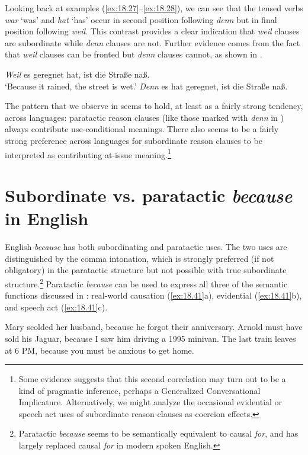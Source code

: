 Looking back at examples (\ref{ex:18.27}--\ref{ex:18.28}), we can see that the tensed verbs \textit{war} ‘was’ and \textit{hat} ‘has’ occur in second position following \textit{denn} but in final position following \textit{weil}. This contrast provides a clear indication that \textit{weil} clauses are subordinate while \textit{denn} clauses are not. Further evidence comes from the fact that \textit{weil} clauses can be fronted but \textit{denn} clauses cannot, as shown in . 

\largerpage
\ea \label{ex:18.32}
\ea  \textit{Weil} es geregnet hat, ist die Straße naß.\\
\glt ‘Because it rained, the street is wet.’
\ex *\textit{Denn} es hat geregnet, ist die Straße naß.\\
\z \z


The pattern that we observe in  seems to hold, at least as a fairly strong tendency, across languages: paratactic reason clauses (like those marked with \textit{denn} in ) always contribute use-conditional meanings. There also seems to be a fairly strong preference across languages for subordinate reason clauses to be interpreted as contributing at-issue meaning.\footnote{Some evidence suggests that this second correlation may turn out to be a kind of pragmatic inference, perhaps a Generalized Conversational Implicature. Alternatively, we might analyze the occasional evidential or speech act uses of subordinate reason clauses as coercion effects.}



\section{Subordinate vs. paratactic \textit{because} in English}\label{sec:18.4}


English \textit{because} has both subordinating and paratactic uses. The two uses are distinguished by the comma intonation, which is strongly preferred (if not obligatory) in the paratactic structure but not possible with true subordinate structure.\footnote{Paratactic \textit{because} seems to be semantically equivalent to causal \textit{for}, and has largely replaced causal \textit{for} in modern spoken English.}  Paratactic \textit{because} can be used to express all three of the semantic functions discussed in : real-world causation (\ref{ex:18.41}a), evidential (\ref{ex:18.41}b), and speech act (\ref{ex:18.41}c).


\ea \label{ex:18.41}
\ea  Mary scolded her husband, because he forgot their anniversary.
\ex Arnold must have sold his Jaguar, because I saw him driving a 1995 minivan.
\ex The last train leaves at 6 PM, because you must be anxious to get home.
                       \z
\z


